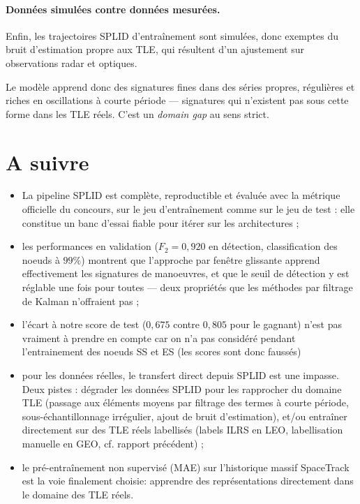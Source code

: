 \documentclass{article}
\begin{document}
\paragraph{Données simulées contre données mesurées.} Enfin, les trajectoires SPLID d'entraînement sont simulées, donc exemptes du bruit d'estimation propre aux TLE, qui résultent d'un ajustement sur observations radar et optiques.

Le modèle apprend donc des signatures fines dans des séries propres, régulières et riches en oscillations à courte période — signatures qui n'existent pas sous cette forme dans les TLE réels. C'est un \textit{domain gap} au sens strict.

\section{A suivre}
\begin{itemize}
    \item La pipeline SPLID est complète, reproductible et évaluée avec la métrique officielle du concours, sur le jeu d'entraînement comme sur le jeu de test : elle constitue un banc d'essai fiable pour itérer sur les architectures ;
    \item les performances en validation ($F_2 = 0{,}920$ en détection, classification des noeuds à $99\%$) montrent que l'approche par fenêtre glissante apprend effectivement les signatures de manoeuvres, et que le seuil de détection y est réglable une fois pour toutes — deux propriétés que les méthodes par filtrage de Kalman n'offraient pas ;
    \item l'écart à notre score de test ($0{,}675$ contre $0{,}805$ pour le gagnant) n'est pas vraiment à prendre en compte car on n'a pas considéré pendant l'entrainement des noeuds SS et ES (les scores sont donc faussés)
    \item pour les données réelles, le transfert direct depuis SPLID est une impasse. Deux pistes : dégrader les données SPLID pour les rapprocher du domaine TLE (passage aux éléments moyens par filtrage des termes à courte période, sous-échantillonnage irrégulier, ajout de bruit d'estimation), et/ou entraîner directement sur des TLE réels labellisés (labels ILRS en LEO, labellisation manuelle en GEO, cf. rapport précédent) ;
    \item le pré-entraînement non supervisé (MAE) sur l'historique massif SpaceTrack est la voie finalement choisie: apprendre des représentations directement dans le domaine des TLE réels.
\end{itemize}
\end{document}
